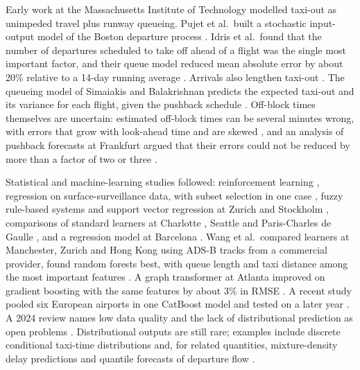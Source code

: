 \documentclass[
  manuscript=article,  %
  layout=preprint,  %
  year=20xx,
  volume=x,
]{extra/joas}
\begin{document}
Early work at the Massachusetts Institute of Technology modelled taxi-out as unimpeded travel plus runway queueing. Pujet et al.\ built a stochastic input-output model of the Boston departure process \cite{pujet1999inputoutput}. Idris et al.\ found that the number of departures scheduled to take off ahead of a flight was the single most important factor, and their queue model reduced mean absolute error by about 20\% relative to a 14-day running average \cite{idris2002queuing}. Arrivals also lengthen taxi-out \cite{clewlow2010impact}. The queueing model of Simaiakis and Balakrishnan predicts the expected taxi-out and its variance for each flight, given the pushback schedule \cite{simaiakis2016queuing}. Off-block times themselves are uncertain: estimated off-block times can be several minutes wrong, with errors that grow with look-ahead time and are skewed \cite{badrinath2020impact}, and an analysis of pushback forecasts at Frankfurt argued that their errors could not be reduced by more than a factor of two or three \cite{carr2004robust}.

Statistical and machine-learning studies followed: reinforcement learning \cite{balakrishna2008airport}, regression on surface-surveillance data, with subset selection in one case \cite{jordan2010statistical,srivastava2011improving}, fuzzy rule-based systems and support vector regression at Zurich and Stockholm \cite{ravizza2013combined,ravizza2014aircraft}, comparisons of standard learners at Charlotte \cite{lee2016taxiout}, Seattle \cite{diana2018can} and Paris-Charles de Gaulle \cite{herrema2018taxiout}, and a regression model at Barcelona \cite{lordan2016forecasting}. Wang et al.\ compared learners at Manchester, Zurich and Hong Kong using ADS-B tracks from a commercial provider, found random forests best, with queue length and taxi distance among the most important features \cite{wang2021aircraft}. A graph transformer at Atlanta improved on gradient boosting with the same features by about 3\% in RMSE \cite{lim2021variable}. A recent study pooled six European airports in one CatBoost model and tested on a later year \cite{swatowska2025generalisable}. A 2024 review names low data quality and the lack of distributional prediction as open problems \cite{yin2024prediction}. Distributional outputs are still rare; examples include discrete conditional taxi-time distributions \cite{liu2026stochastic} and, for related quantities, mixture-density delay predictions \cite{zoutendijk2021probabilistic} and quantile forecasts of departure flow \cite{zhou2025riskaware}.
\end{document}
